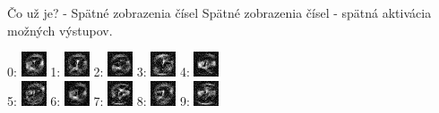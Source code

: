 \documentclass[xcolor=dvipsnames]{beamer}
\begin{document}
\begin{frame}{Čo už je? - Spätné zobrazenia čísel}
  Spätné zobrazenia čísel - spätná aktivácia možných výstupov.

  \begin{center}
    0:
    \includegraphics[scale=1]{img/dig_0.png}
    1:
    \includegraphics[scale=1]{img/dig_1.png}
    2:
    \includegraphics[scale=1]{img/dig_2.png}
    3:
    \includegraphics[scale=1]{img/dig_3.png}
    4:
    \includegraphics[scale=1]{img/dig_4.png}
    \\
    5:
    \includegraphics[scale=1]{img/dig_5.png}
    6:
    \includegraphics[scale=1]{img/dig_6.png}
    7:
    \includegraphics[scale=1]{img/dig_7.png}
    8:
    \includegraphics[scale=1]{img/dig_8.png}
    9:
    \includegraphics[scale=1]{img/dig_9.png}
  \end{center}
  
  
\end{frame}
\end{document}

